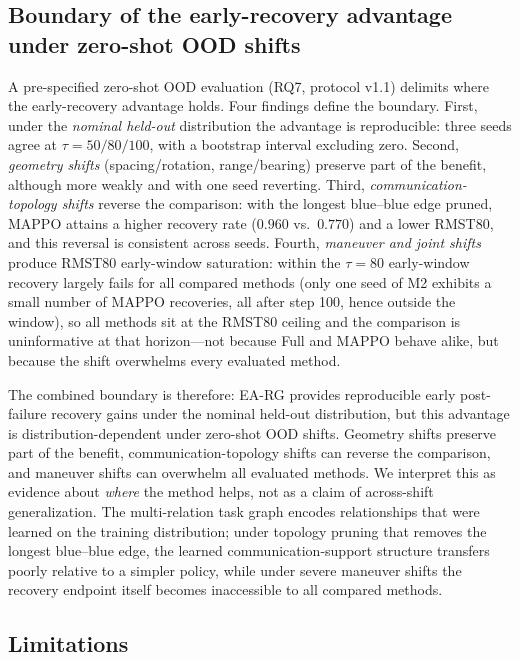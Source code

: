 \subsection{Boundary of the early-recovery advantage under zero-shot OOD shifts}

A pre-specified zero-shot OOD evaluation (RQ7, protocol v1.1) delimits where the early-recovery advantage holds. Four findings define the boundary. First, under the \emph{nominal held-out} distribution the advantage is reproducible: three seeds agree at $\tau=50/80/100$, with a bootstrap interval excluding zero. Second, \emph{geometry shifts} (spacing/rotation, range/bearing) preserve part of the benefit, although more weakly and with one seed reverting. Third, \emph{communication-topology shifts} reverse the comparison: with the longest blue--blue edge pruned, MAPPO attains a higher recovery rate ($0.960$ vs.\ $0.770$) and a lower RMST80, and this reversal is consistent across seeds. Fourth, \emph{maneuver and joint shifts} produce RMST80 early-window saturation: within the $\tau=80$ early-window recovery largely fails for all compared methods (only one seed of M2 exhibits a small number of MAPPO recoveries, all after step 100, hence outside the window), so all methods sit at the RMST80 ceiling and the comparison is uninformative at that horizon---not because Full and MAPPO behave alike, but because the shift overwhelms every evaluated method.

The combined boundary is therefore: EA-RG provides reproducible early post-failure recovery gains under the nominal held-out distribution, but this advantage is distribution-dependent under zero-shot OOD shifts. Geometry shifts preserve part of the benefit, communication-topology shifts can reverse the comparison, and maneuver shifts can overwhelm all evaluated methods. We interpret this as evidence about \emph{where} the method helps, not as a claim of across-shift generalization. The multi-relation task graph encodes relationships that were learned on the training distribution; under topology pruning that removes the longest blue--blue edge, the learned communication-support structure transfers poorly relative to a simpler policy, while under severe maneuver shifts the recovery endpoint itself becomes inaccessible to all compared methods.

\subsection{Limitations}

